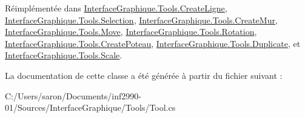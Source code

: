 Réimplémentée dans \hyperlink{class_interface_graphique_1_1_tools_1_1_create_ligne_abc111e3dc2d9dfe15050d58631c45564}{Interface\-Graphique.\-Tools.\-Create\-Ligne}, \hyperlink{class_interface_graphique_1_1_tools_1_1_selection_a1b44917e1b656fcebe00ce72c77dbc65}{Interface\-Graphique.\-Tools.\-Selection}, \hyperlink{class_interface_graphique_1_1_tools_1_1_create_mur_abe8d1a32d61c3057490450bf9ff2b17c}{Interface\-Graphique.\-Tools.\-Create\-Mur}, \hyperlink{class_interface_graphique_1_1_tools_1_1_move_ab9f7749ef77fb21f385a9bc5b43bf234}{Interface\-Graphique.\-Tools.\-Move}, \hyperlink{class_interface_graphique_1_1_tools_1_1_rotation_a756456f57a12c3e9b9606d9b63023f0f}{Interface\-Graphique.\-Tools.\-Rotation}, \hyperlink{class_interface_graphique_1_1_tools_1_1_create_poteau_a11cb39fe881af64c1be87c44cc1c8306}{Interface\-Graphique.\-Tools.\-Create\-Poteau}, \hyperlink{class_interface_graphique_1_1_tools_1_1_duplicate_aa8bb7b1bf21dceacd60ac1a502c31a40}{Interface\-Graphique.\-Tools.\-Duplicate}, et \hyperlink{class_interface_graphique_1_1_tools_1_1_scale_aac4bb7da59fdb782e8ac30fb10324398}{Interface\-Graphique.\-Tools.\-Scale}.



La documentation de cette classe a été générée à partir du fichier suivant \-:\begin{DoxyCompactItemize}
\item 
C\-:/\-Users/saron/\-Documents/inf2990-\/01/\-Sources/\-Interface\-Graphique/\-Tools/Tool.\-cs\end{DoxyCompactItemize}
